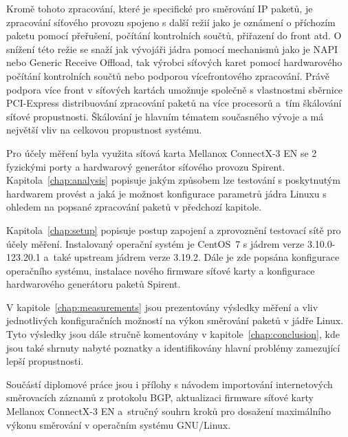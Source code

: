 \documentclass[english]{fitthesis} %
\begin{document}
Kromě tohoto zpracování, které je specifické pro směrování IP paketů, je zpracování síťového provozu
spojeno s další režií jako je oznámení o příchozím paketu pomocí přeřušení,
počítání kontrolních součtů, přiřazení do front atd.
O snížení této režie se snaží jak vývojáři jádra pomocí mechanismů jako je NAPI nebo Generic Receive Offload,
tak výrobci síťových karet pomocí hardwarového počítání kontrolních součtů nebo podporou vícefrontového zpracování.
Právě podpora více front v síťových kartách umožnuje společně s vlastnostmi sběrnice PCI-Express
distribuování zpracování paketů na více procesorů a~tím škálování síťové propustnosti.
Škálování je hlavním tématem současného vývoje a má největší vliv na celkovou propustnost systému.

Pro účely měření byla využita síťová karta Mellanox ConnectX-3 EN se 2 fyzickými porty
a hardwarový generátor síťového provozu Spirent.
Kapitola~\ref{chap:analysis} popisuje jakým způsobem lze testování s poskytnutým hardwarem provést
a jaká je možnost konfigurace parametrů jádra Linuxu s ohledem na popsané zpracování paketů v předchozí kapitole.

Kapitola~\ref{chap:setup} popisuje postup zapojení a zprovoznění testovací sítě pro účely měření.
Instalovaný operační systém je CentOS~7 s jádrem verze 3.10.0-123.20.1 a~také upstream jádrem verze 3.19.2.
Dále je zde popsána konfigurace operačního systému, instalace nového firmware síťové karty a konfigurace hardwarového generátoru
paketů Spirent.

V kapitole~\ref{chap:measurements} jsou prezentovány výsledky měření a vliv jednotlivých konfiguračních možností
na výkon směrování paketů v jádře Linux.
Tyto výsledky jsou dále stručně komentovány v kapitole~\ref{chap:conclusion}, kde jsou také shrnuty nabyté poznatky
a identifikovány hlavní problémy zamezující lepší propustnosti.

Součástí diplomové práce jsou i přílohy s návodem importování internetových směrovacích záznamů z protokolu BGP,
aktualizaci firmware síťové karty Mellanox ConnectX-3 EN
a~stručný souhrn kroků pro dosažení maximálního výkonu směrování v operačním systému GNU/Linux.

  \setcounter{tocdepth}{1}
  \tableofcontents
  


\ifczech
  
\else 
  
%  
\fi
  \begin{flushleft}
  \end{flushleft}
  \appendix
  
\end{document}
